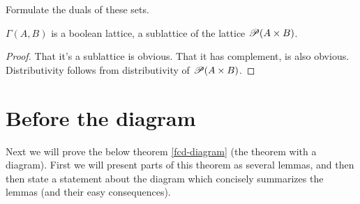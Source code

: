 \begin{xca}
Formulate the duals of these sets.\end{xca}
\begin{prop}
$\Gamma(A,B)$ is a boolean lattice, a sublattice of the lattice $\mathscr{P}(A\times B)$.\end{prop}
\begin{proof}
That it's a sublattice is obvious. That it has complement, is also
obvious. Distributivity follows from distributivity of $\mathscr{P}(A\times B)$.
\end{proof}

\section{Before the diagram}

Next we will prove the below theorem \ref{fcd-diagram} (the theorem
with a diagram). First we will present parts of this theorem as several
lemmas, and then then state a statement about the diagram which concisely
summarizes the lemmas (and their easy consequences).

